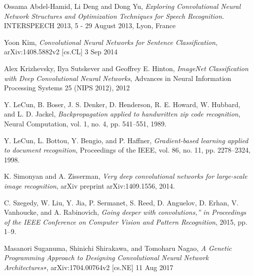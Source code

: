 \documentclass[conference]{IEEEtran}
\begin{document}
%
%
%
\begin{thebibliography}{11}

Ossama Abdel-Hamid, Li Deng and Dong Yu, \emph{Exploring Convolutional Neural Network Structures and Optimization Techniques for Speech Recognition}. INTERSPEECH 2013, 5 - 29 August 2013, Lyon, France

Yoon Kim, \emph{Convolutional Neural Networks for Sentence Classification}, arXiv:1408.5882v2 [cs.CL] 3 Sep 2014

Alex Krizhevsky, Ilya Sutskever and Geoffrey E. Hinton, \emph{ImageNet Classification with Deep Convolutional Neural Networks}, Advances in Neural Information Processing Systems 25 (NIPS 2012), 2012

Y. LeCun, B. Boser, J. S. Denker, D. Henderson, R. E. Howard, W. Hubbard, and L. D. Jackel, \emph{Backpropagation applied to handwritten zip code recognition}, Neural Computation, vol. 1, no. 4, pp. 541–551, 1989. 

Y. LeCun, L. Bottou, Y. Bengio, and P. Haffner, \emph{Gradient-based learning applied to document recognition}, Proceedings of the IEEE, vol. 86, no. 11, pp. 2278–2324, 1998.

K. Simonyan and A. Zisserman, \emph{Very deep convolutional networks for large-scale image recognition}, arXiv preprint arXiv:1409.1556, 2014.

C. Szegedy, W. Liu, Y. Jia, P. Sermanet, S. Reed, D. Anguelov, D. Erhan, V. Vanhoucke, and A. Rabinovich, \emph{Going deeper with convolutions,” in Proceedings of the IEEE Conference on Computer Vision and Pattern Recognition}, 2015, pp. 1–9.

Masanori Suganuma, Shinichi Shirakawa, and Tomoharu Nagao, \emph{A Genetic Programming Approach to Designing Convolutional Neural Network Architectures∗}, arXiv:1704.00764v2  [cs.NE]  11 Aug 2017


\end{thebibliography}
\end{document}
